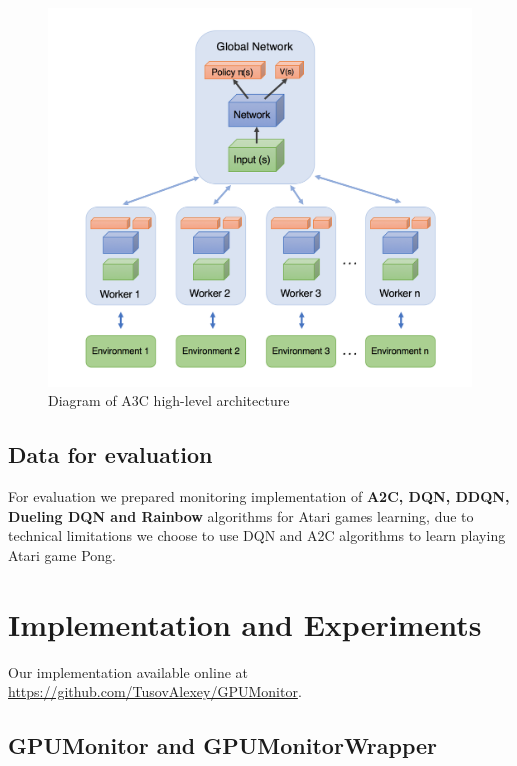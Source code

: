 \documentclass[11 pt, twocolumn]{article}
\begin{document}
\begin{figure}
\centering
\includegraphics[width=0.93\columnwidth]{A3C.png}
\caption{Diagram of A3C high-level architecture}
\vspace*{2pt}
\end{figure}



\subsection{Data for evaluation}
For evaluation we prepared monitoring implementation of \textbf{A2C, DQN, DDQN, Dueling DQN and Rainbow} algorithms for Atari games learning, due to technical limitations we choose to use DQN and A2C algorithms to learn playing Atari game Pong.

\section{Implementation and Experiments}
Our implementation available online at \url{https://github.com/TusovAlexey/GPUMonitor}.


\subsection{GPUMonitor and GPUMonitorWrapper}
\end{document}
